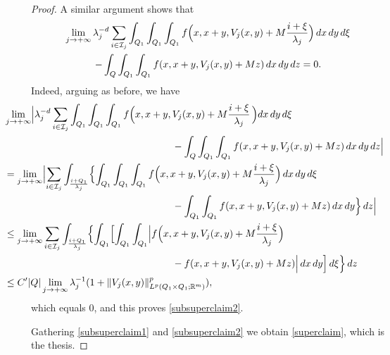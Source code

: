 \documentclass{article}
\theoremstyle{definition}
\newcommand{\R}{\mathbb{R}}
\begin{document}
\begin{proof}
A similar argument shows that
\begin{multline} \label{subsuperclaim2}
     \lim_{j\to+\infty } \lambda_j^{-d} \sum_{i\in \mathcal{I}_j}\int_{Q_1}   \int_{Q_1} \int_{Q_1} f\Bigl(x,x+y,V_j(x,y)+M\frac{i+\xi}{\lambda_j}\Bigr)\, dx \, dy\,d\xi \\ 
     -\int_Q \int_{Q_1} \int_{Q_1} f(x,x+y,V_j(x,y)+Mz)\,dx \, dy\, dz =0.
\end{multline}
Indeed, arguing as before, we have
\begin{align*}
    & \hspace{-1cm} \lim_{j\to+\infty } \Bigl| \lambda_j^{-d} \sum_{i\in \mathcal{I}_j}\int_{Q_1} \int_{Q_1} \int_{Q_1} f\Bigl(x,x+y,V_j(x,y)+M\frac{i+\xi}{\lambda_j}\, \Bigr)dx \, dy\, d\xi \\
    & \hspace{5cm} -\int_Q \int_{Q_1} \int_{Q_1} f(x,x+y,V_j(x,y)+Mz)\,dx \, dy\, dz \Bigr| \\
&  \hspace{-1cm} = \lim_{j\to+\infty} \Bigl| \sum_{i\in \mathcal{I}_j} \int_{\frac{i+Q_1}{\lambda_j}} \Bigl\{ \int_{Q_1} \int_{Q_1} \int_{Q_1} f\Bigl(x,x+y,V_j(x,y)+M\frac{i+\xi}{\lambda_j}\Bigr)\, dx \, dy\, d\xi \\
& \hspace{5cm} -\int_{Q_1}\int_{Q_1} f(x,x+y,V_j(x,y)+Mz)\,dx \, dy \Bigr\}\,dz \Bigr| \\
    & \hspace{-1cm} \leq \lim_{j\to+\infty}  \sum_{i\in \mathcal{I}_j} \int_{\frac{i+Q_1}{\lambda_j}}\Bigl\{ \int_{Q_1}\Bigl[\int_{Q_1}\int_{Q_1}\Bigl|f\Bigl(x,x+y,V_j(x,y)+M\frac{i+\xi}{\lambda_j}\Bigr) \\
    & \hspace{5cm} - f(x,x+y,V_j(x,y)+Mz) \Bigr|\,dx\,dy\Bigr]\,d\xi \Bigr\}\,dz \\
    & \hspace{-1cm} \leq C'|Q|\lim_{j\to+\infty} \lambda_j^{-1}(1+\|V_j(x,y)\|^p_{L^p(Q_1\times Q_1;\R^m)}),
\end{align*}
which equals $0$, and this proves \eqref{subsuperclaim2}.

Gathering \eqref{subsuperclaim1} and \eqref{subsuperclaim2} we obtain \eqref{superclaim}, which is the thesis.
\end{proof}
\end{document}
